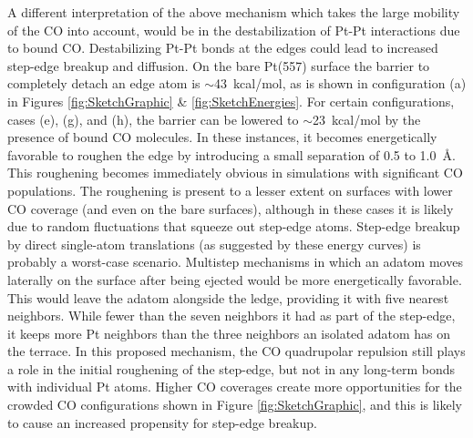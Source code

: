 A different interpretation of the above mechanism which takes the
large mobility of the CO into account, would be in the destabilization
of Pt-Pt interactions due to bound CO.  Destabilizing Pt-Pt bonds at
the edges could lead to increased step-edge breakup and diffusion. On
the bare Pt(557) surface the barrier to completely detach an edge atom
is $\sim$43~kcal/mol, as is shown in configuration (a) in Figures
\ref{fig:SketchGraphic} \& \ref{fig:SketchEnergies}. For certain
configurations, cases (e), (g), and (h), the barrier can be lowered to
$\sim$23~kcal/mol by the presence of bound CO molecules. In these
instances, it becomes energetically favorable to roughen the edge by
introducing a small separation of 0.5 to 1.0~\AA. This roughening
becomes immediately obvious in simulations with significant CO
populations. The roughening is present to a lesser extent on surfaces
with lower CO coverage (and even on the bare surfaces), although in
these cases it is likely due to random fluctuations that squeeze out
step-edge atoms. Step-edge breakup by direct single-atom translations
(as suggested by these energy curves) is probably a worst-case
scenario.  Multistep mechanisms in which an adatom moves laterally on
the surface after being ejected would be more energetically favorable.
This would leave the adatom alongside the ledge, providing it with
five nearest neighbors.  While fewer than the seven neighbors it had
as part of the step-edge, it keeps more Pt neighbors than the three
neighbors an isolated adatom has on the terrace. In this proposed
mechanism, the CO quadrupolar repulsion still plays a role in the
initial roughening of the step-edge, but not in any long-term bonds
with individual Pt atoms.  Higher CO coverages create more
opportunities for the crowded CO configurations shown in Figure
\ref{fig:SketchGraphic}, and this is likely to cause an increased
propensity for step-edge breakup.

